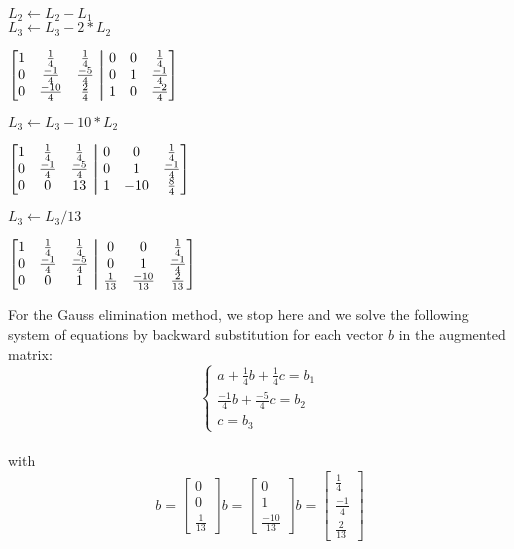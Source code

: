 \documentclass[12pt]{article}
\newcommand\aug{\fboxsep=-\fboxrule\!\!\!\fbox{\strut}\!\!\!}
\begin{document}
\noindent $L_2 \gets L_2 - L_1$ \\
$L_3 \gets L_3 - 2 * L_2$ \\
\begin{center}
$\begin{bmatrix}
1 & \frac{1}{4} & \frac{1}{4} & \aug & 0 & 0 & \frac{1}{4} \\
0 & \frac{-1}{4} & \frac{-5}{4} & \aug & 0 & 1 & \frac{-1}{4} \\
0 & \frac{-10}{4} & \frac{2}{4} & \aug & 1 & 0 & \frac{-2}{4} \\
\end{bmatrix}$
\end{center}

\noindent $L_3 \gets L_3 - 10 * L_2$ \\
\begin{center}
$\begin{bmatrix}
1 & \frac{1}{4} & \frac{1}{4} & \aug & 0 & 0 & \frac{1}{4} \\
0 & \frac{-1}{4} & \frac{-5}{4} & \aug & 0 & 1 & \frac{-1}{4} \\
0 & 0 & 13 & \aug & 1 & -10 & \frac{8}{4} \\
\end{bmatrix}$
\end{center}


\noindent $L_3 \gets L_3/13$ \\
\begin{center}
$\begin{bmatrix}
1 & \frac{1}{4} & \frac{1}{4} & \aug & 0 & 0 & \frac{1}{4} \\
0 & \frac{-1}{4} & \frac{-5}{4} & \aug & 0 & 1 & \frac{-1}{4} \\
0 & 0 & 1 & \aug & \frac{1}{13} & \frac{-10}{13} & \frac{2}{13} \\
\end{bmatrix}$
\end{center}

\noindent For the Gauss elimination method, we stop here and we solve the following system of equations by backward substitution for each vector $b$ in the augmented matrix: \\
$$\begin{cases}
  a + \frac{1}{4}b + \frac{1}{4}c = b_1 \\
  \frac{-1}{4}b + \frac{-5}{4}c = b_2 \\
  c = b_3
\end{cases}$$ \\

with $$ b = \begin{bmatrix}
  0 \\
  0 \\
  \frac{1}{13}
\end{bmatrix} b = \begin{bmatrix}
  0 \\
  1 \\
  \frac{-10}{13}
\end{bmatrix} b = \begin{bmatrix}
  \frac{1}{4} \\
  \frac{-1}{4} \\
  \frac{2}{13}
\end{bmatrix} $$ \\
\end{document}
